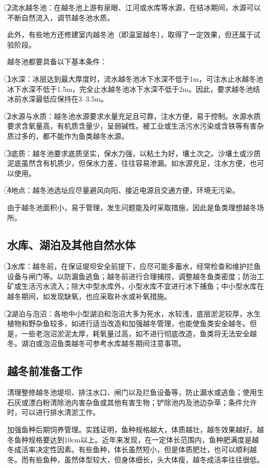 \documentclass{ctexbook}
\begin{document}
\textcircled{2}{\fangsong 流水越冬池}：在越冬池上游有泉眼、江河或水库等水源，在结冰期间，水源可以不断自然流入，调节越冬池水质。

此外，有些地方还修建室内越冬池（即温室越冬），取得了一定效果，但还属于试验阶段。

越冬池都要具备以下基本条件：

\textcircled{1}水深：冰层达到最大厚度时，流水越冬池冰下水深不低于1m，可注水止水越冬池冰下水深不低于1.5m，完全止水越冬池冰下水深不低于2m。因此，要求越冬池结冰前水深最低应保持在3--3.5m。

\textcircled{2}水源与水质：越冬池水源要求水量充足且可靠，注水方便，易于控制。水源水质要求含氧量高，有机质含量少，呈弱碱性。被工业或生活污水污染或含铁等有害杂质过多的，都不能作为鱼类越冬水源。

\textcircled{3}底质：越冬池要求底质坚实，保水力强，以粘土为好，壤土次之。沙壤土或沙质泥底虽然含有机质少，但保水力差，往往容易渗漏。如水源充足，注水方便，也可以使用。

\textcircled{4}地点：越冬池选址应尽量避风向阳、接近电源且交通方便，环境无污染。

由于越冬池面积小，易于管理，发生问题能及时采取措施，因此是鱼类理想越冬场所。
\subsection{水库、湖泊及其他自然水体}
\textcircled{1}水库：越冬前，在保证堤坝安全前提下，应尽可能多蓄水，经常检查和维护拦鱼设备与闸门等。以防漏鱼逃鱼；越冬前进行合理捕捞，调整越冬鱼类密度；防治工矿或生活污水流入；除大中型水库外，小型水库不宜进行冰下捕鱼；中小型水库在越冬期间，如发现缺氧，也应采取补水或补氧措施。

\textcircled{2}湖泊与泡沼：各地中小型湖泊和泡沼大多为死水，水较浅，底层淤泥较厚，水生植物和野杂鱼较多，如进行适当改造和加强越冬管理，也能使鱼类安全越冬。但是，一些老泡沼淤泥太厚，耗氧量过高，如不进行彻底改造，鱼类将无法安全越冬。湖泊或泡沼鱼类越冬可参考水库越冬期间注意事项。
\subsection{越冬前准备工作}
清理整修越冬池堤坝、排注水口、闸门以及拦鱼设备等，防止漏水或逃鱼；使用生石灰或漂白粉清除池内害杂鱼或其他有害生物；铲除池内及池边杂草；条件允许时，可以进行排水清淤工作。

加强鱼种后期饲养管理。实践证明，鱼种规格越大，体质越壮，越冬效果越好。越冬鱼种规格要达到10cm以上。近年来发现，在一定体长范围内，鱼种肥满度是越冬成活率决定性因素。有些鱼种，体长虽然短小，但是体质肥壮，也可以顺利越冬。而有些鱼种，虽然体型较大，但身体细长，头大体瘦，越冬成活率往往很低。
\end{document}
